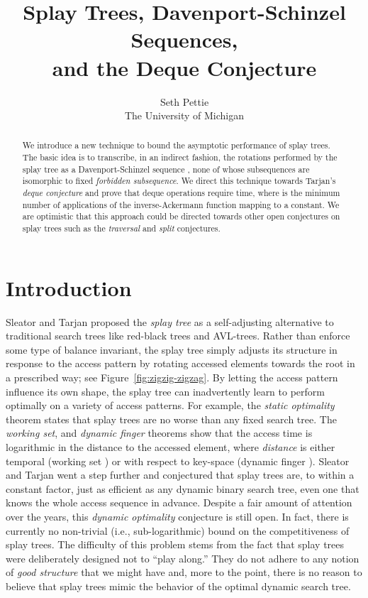 \documentclass{article}
\title{Splay Trees, Davenport-Schinzel Sequences,\\
and the Deque Conjecture}
\author{Seth Pettie\\ The University of Michigan}
\date{}
\begin{document}
\maketitle
\begin{abstract}
We introduce a new technique to bound the asymptotic performance of splay trees.
The basic idea is to transcribe, in an indirect fashion, the rotations performed by the splay tree
as a Davenport-Schinzel sequence , none of whose subsequences are isomorphic to
fixed {\em forbidden subsequence}.
We direct this technique towards Tarjan's {\em deque conjecture} and prove that  deque operations
require  time, where  is the minimum number of applications of the inverse-Ackermann
function mapping  to a constant.  We are optimistic that this approach could be directed towards other
open conjectures on splay trees such as the {\em traversal} and {\em split} conjectures.
\end{abstract}

\section{Introduction}

Sleator and Tarjan proposed the {\em splay tree} \cite{ST85} as a self-adjusting alternative to traditional search trees like red-black trees and AVL-trees.
Rather than enforce some type of balance invariant, the splay tree simply adjusts its structure in response to the access pattern by rotating accessed
elements towards the root in a prescribed way; see Figure~\ref{fig:zigzig-zigzag}.  
By letting the access pattern influence its own shape, the splay tree can inadvertently learn to perform
optimally on a variety of access patterns.  For example, the {\em static optimality} theorem states that splay trees are no worse than any fixed search tree.
The {\em working set}, and {\em dynamic finger} theorems show that the access time is logarithmic in the distance to the accessed 
element, where {\em distance} is either temporal (working set \cite{ST85}) or with respect to key-space (dynamic finger \cite{ColeEtal00,Cole00}).
Sleator and Tarjan went a step further and conjectured that splay trees are, to within a constant factor, just as efficient as any dynamic binary search
tree, even one that knows the whole access sequence in advance.  Despite a fair amount of attention over the years, this {\em dynamic optimality} conjecture
is still open.  In fact, there is currently no non-trivial (i.e., sub-logarithmic) bound on the competitiveness of splay trees.
The difficulty of this problem stems from the fact that splay trees were deliberately designed not to ``play along.''  They do not adhere to any notion
of {\em good structure} that we might have and, more to the point, there is no reason to believe that splay trees mimic the behavior of
the optimal dynamic search tree.
\end{document}
